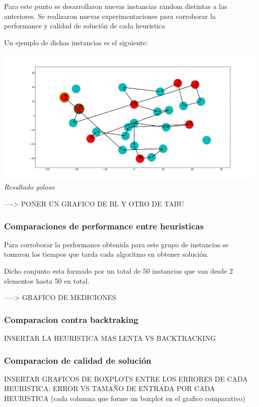 Para este punto se desarrollaron nuevas instancias random distintas a las anteriores. Se realizaron nuevas experimentaciones para corroborar la performance y calidad de soluci\'on de cada heuristica

Un ejemplo de dichas instancias es el siguiente:

\vspace*{0.3cm} \vspace*{0.3cm}
  \begin{center}
\includegraphics[scale=0.5]{./EJ5/caminoEjGoloso.png}
\\{\textit{Resultado goloso}}
  \end{center}
  \vspace*{0.3cm}
----> PONER UN GRAFICO DE BL Y OTRO DE TABU

\subsubsection{Comparaciones de performance entre heuristicas}

Para corroborar la performance obtenida para este grupo de instancias se tomaron los tiempos que tarda cada algoritmo en obtener soluci\'on.

Dicho conjunto esta formado por un total de 50 instancias que van desde 2 elementos hasta 50 en total.

-----> GRAFICO DE MEDICIONES 






\subsubsection*{Comparacion contra backtraking}
INSERTAR LA HEURISTICA MAS LENTA VS BACKTRACKING
\subsubsection{Comparacion de calidad de solución}
INSERTAR GRAFICOS DE BOXPLOTS ENTRE LOS ERRORES DE CADA HEURISTICA:
	ERROR VS TAMAÑO DE ENTRADA POR CADA HEURISTICA (cada columna que forme un boxplot en el grafico comparativo)
	